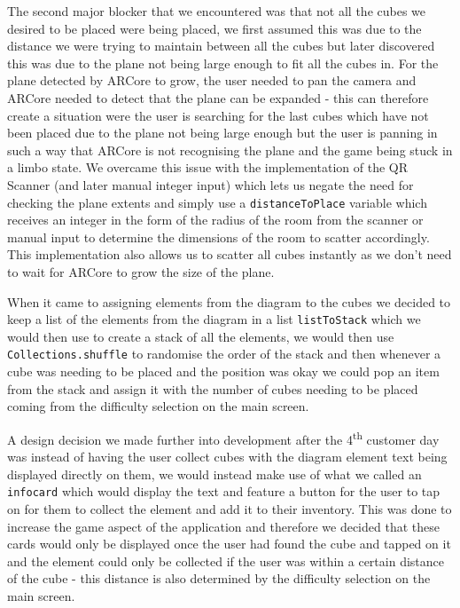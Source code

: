 \documentclass{l3proj}
\begin{document}
The second major blocker that we encountered was that not all the cubes we desired to be placed were being placed, we first assumed this was due to the distance we were trying to maintain between all the cubes but later discovered this was due to the plane not being large enough to fit all the cubes in. For the plane detected by ARCore to grow, the user needed to pan the camera and ARCore needed to detect that the plane can be expanded - this can therefore create a situation were the user is searching for the last cubes which have not been placed due to the plane not being large enough but the user is panning in such a way that ARCore is not recognising the plane and the game being stuck in a limbo state. We overcame this issue with the implementation of the QR Scanner (and later manual integer input) which lets us negate the need for checking the plane extents and simply use a \verb|distanceToPlace| variable which receives an integer in the form of the radius of the room from the scanner or manual input to determine the dimensions of the room to scatter accordingly. This implementation also allows us to scatter all cubes instantly as we don't need to wait for ARCore to grow the size of the plane.

When it came to assigning elements from the diagram to the cubes we decided to keep a list of the elements from the diagram in a list \verb|listToStack| which we would then use to create a stack of all the elements, we would then use \verb|Collections.shuffle| to randomise the order of the stack and then whenever a cube was needing to be placed and the position was okay we could pop an item from the stack and assign it with the number of cubes needing to be placed coming from the difficulty selection on the main screen.

A design decision we made further into development after the 4\textsuperscript{th} customer day was instead of having the user collect cubes with the diagram element text being displayed directly on them, we would instead make use of what we called an \verb|infocard| which would display the text and feature a button for the user to tap on for them to collect the element and add it to their inventory. This was done to increase the game aspect of the application and therefore we decided that these cards would only be displayed once the user had found the cube and tapped on it and the element could only be collected if the user was within a certain distance of the cube - this distance is also determined by the difficulty selection on the main screen.
\end{document}
